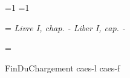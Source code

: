 \def\cap#1{\ifvmode \nobreak\hbox{\Vers{\the\chapitre}}
      \nobreak\vskip-\baselineskip\allowbreak
   \else \skip0=\lastskip\unskip\Vers{\the\chapitre}\hskip\skip0 \fi
   \Vers{#1}\global\chapitre={#1}{\bf #1.}\nobreak}
\newtoks\chapitreL \newtoks\chapitreP %
\chapitreL={1} \chapitreP={1} %
\def\sec#1{\Vers{\the\chapitre}(#1)\nobreak}

\def\nastavlevy{\language=\latin \frenchpunct \let\chapitre=\chapitreL} 
\def\nastavpravy{\language=\french \frenchpunct \let\chapitre=\chapitreP
   \catcode‘\"=13 }

\headline={\it %
   \ifodd\pageno %
      \hfil Livre I, chap.
      \ifx\firstmarkP\botmarkP \firstmarkP %
         \else \firstmarkP-\botmarkP \fi \hfil %
   \llap{\folio}%
\else %
   \rlap{\folio}%
   \hfil Liber I, cap.
   \ifx\firstmarkL\botmarkL \firstmarkL %
      \else \firstmarkL-\botmarkL \fi \hfil %
\fi}

\footline={}

\def\novalevastrana{{\headline={\hfil}\null\vfil\break}}

\csname FinDuChargement\endcsname
\zrcadli caes-l caes-f %
\bye %

